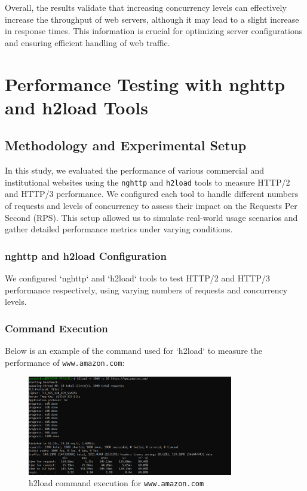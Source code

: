\documentclass[a4paper,10pt]{article}
\begin{document}
Overall, the results validate that increasing concurrency levels can effectively increase the throughput of web servers, although it may lead to a slight increase in response times. This information is crucial for optimizing server configurations and ensuring efficient handling of web traffic.

\section{Performance Testing with nghttp and h2load Tools}

\subsection{Methodology and Experimental Setup}

In this study, we evaluated the performance of various commercial and institutional websites using the \texttt{nghttp} and \texttt{h2load} tools to measure HTTP/2 and HTTP/3 performance. We configured each tool to handle different numbers of requests and levels of concurrency to assess their impact on the Requests Per Second (RPS). This setup allowed us to simulate real-world usage scenarios and gather detailed performance metrics under varying conditions.

\subsubsection{nghttp and h2load Configuration}
We configured `nghttp` and `h2load` tools to test HTTP/2 and HTTP/3 performance respectively, using varying numbers of requests and concurrency levels.

\subsubsection{Command Execution}
Below is an example of the command used for `h2load` to measure the performance of \texttt{www.amazon.com}:

\begin{figure}[H]
\centering
\includegraphics[width=0.8\textwidth]{shot2.png}
\caption{h2load command execution for \texttt{www.amazon.com}}
\label{fig:h2load_screenshot}
\end{figure}
\end{document}
